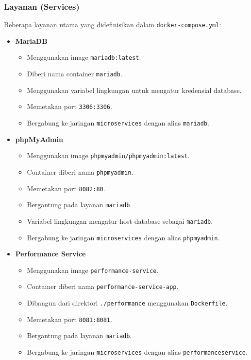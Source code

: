 \subsubsection{Layanan (Services)}
Beberapa layanan utama yang didefinisikan dalam \texttt{docker-compose.yml}:

\begin{itemize}
	\item \textbf{MariaDB}
	\begin{itemize}
		\item Menggunakan image \texttt{mariadb:latest}.
		\item Diberi nama container \texttt{mariadb}.
		\item Menggunakan variabel lingkungan untuk mengatur kredensial database.
		\item Memetakan port \texttt{3306:3306}.
		\item Bergabung ke jaringan \texttt{microservices} dengan alias \texttt{mariadb}.
	\end{itemize}
	
	\item \textbf{phpMyAdmin}
	\begin{itemize}
		\item Menggunakan image \texttt{phpmyadmin/phpmyadmin:latest}.
		\item Container diberi nama \texttt{phpmyadmin}.
		\item Memetakan port \texttt{8082:80}.
		\item Bergantung pada layanan \texttt{mariadb}.
		\item Variabel lingkungan mengatur host database sebagai \texttt{mariadb}.
		\item Bergabung ke jaringan \texttt{microservices} dengan alias \texttt{phpmyadmin}.
	\end{itemize}
	
	\item \textbf{Performance Service}
	\begin{itemize}
		\item Menggunakan image \texttt{performance-service}.
		\item Container diberi nama \texttt{performance-service-app}.
		\item Dibangun dari direktori \texttt{./performance} menggunakan \texttt{Dockerfile}.
		\item Memetakan port \texttt{8081:8081}.
		\item Bergantung pada layanan \texttt{mariadb}.
		\item Bergabung ke jaringan \texttt{microservices} dengan alias \texttt{performanceservice}.
	\end{itemize}
	

\end{itemize}
